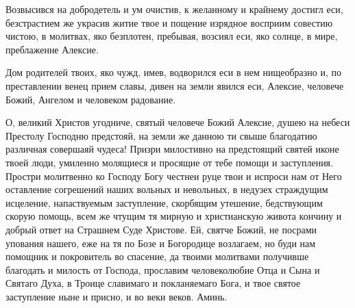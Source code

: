 



Возвысився на добродетель и ум очистив, к желанному и крайнему достигл еси, безстрастием же украсив житие твое и пощение изрядное восприим совестию чистою, в молитвах, яко безплотен, пребывая, возсиял еси, яко солнце, в мире, преблаженне Алексие.




Дом родителей твоих, яко чужд, имев, водворился еси в нем нищеобразно и, по преставлении венец прием славы, дивен на земли явился еси, Алексие, человече Божий, Ангелом и человеком радование.




О, великий Христов угодниче, святый человече Божий Алексие, душею на небеси Престолу Господню предстояй, на земли же данною ти свыше благодатию различная совершаяй чудеса! Призри милостивно на предстоящий святей иконе твоей люди, умиленно молящиеся и просящие от тебе помощи и заступления. Простри молитвенно ко Господу Богу честнеи руце твои и испроси нам от Него оставление согрешений наших вольных и невольных, в недузех страждущим исцеление, напаствуемым заступление, скорбящим утешение, бедствующим скорую помощь, всем же чтущим тя мирную и христианскую живота кончину и добрый ответ на Страшнем Суде Христове. Ей, святче Божий, не посрами упования нашего, еже на тя по Бозе и Богородице возлагаем, но буди нам помощник и покровитель во спасение, да твоими молитвами получивше благодать и милость от Господа, прославим человеколюбие Отца и Сына и Святаго Духа, в Троице славимаго и покланяемаго Бога, и твое святое заступление ныне и присно, и во веки веков. Аминь.
\mychapterending

 


